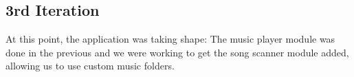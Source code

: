 \subsection{3rd Iteration}
At this point, the application was taking shape: The music player module was done in the previous and we were working to get the song scanner module added, allowing us to use custom music folders.
